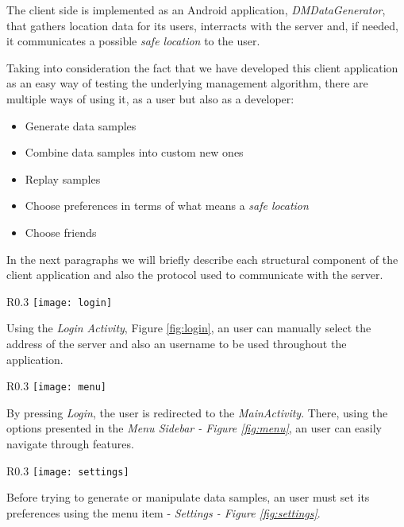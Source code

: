 The client side is implemented as an Android application, \textit{DMDataGenerator}, that gathers location data for its users, interracts with the server and, if needed, it communicates a possible \textit{safe location} to the user.

Taking into consideration the fact that we have developed this client application as an easy way of testing the underlying management algorithm, there are multiple ways of using it, as a user but also as a developer:

\begin{itemize}
\item Generate data samples
\item Combine data samples into custom new ones
\item Replay samples
\item Choose preferences in terms of what means a \textit{safe location}
\item Choose friends
\end{itemize}

In the next paragraphs we will briefly describe each structural component of the client application and also the protocol used to communicate with the server.

\begin{wrapfigure}{R}{0.3\textwidth}
\centering
\texttt{[image: login]}
\caption{\label{fig:login}Login Activity}
\end{wrapfigure}

Using the \textit{Login Activity}, Figure \ref{fig:login}, an user can manually select the address of the server and also an username to be used throughout the application. 

\begin{wrapfigure}{R}{0.3\textwidth}
\centering
\texttt{[image: menu]}
\caption{\label{fig:menu} Menu sidebar}
\end{wrapfigure}

By pressing \textit{Login}, the user is redirected to the \textit{MainActivity}. There, using the options presented in the \textit{Menu Sidebar - Figure \ref{fig:menu}}, an user can easily navigate through features.

\begin{wrapfigure}{R}{0.3\textwidth}
\centering
\texttt{[image: settings]}
\caption{\label{fig:settings}Settings Activity}
\end{wrapfigure}

Before trying to generate or manipulate data samples, an user must set its preferences using the menu item - \textit{Settings - Figure \ref{fig:settings}}.

